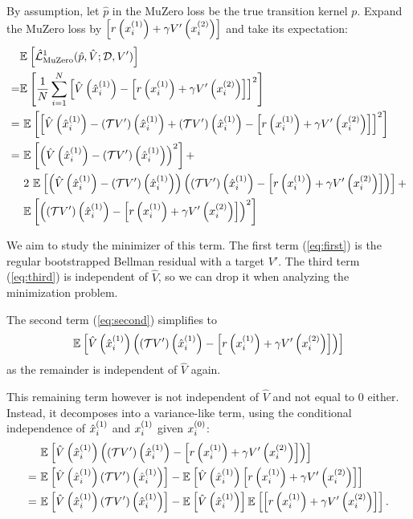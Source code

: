 By assumption, let $\hat{p}$ in the MuZero loss be the true transition kernel $p$. Expand the MuZero loss by $\TrV$ and take its expectation:
\begin{align}
    &\EEX{}{\hat{\mathcal{L}}^1_\text{MuZero}(\hat{p}, \hat{V}; \mathcal{D}, V')}\nonumber\\ 
  =& \EEX{}{\frac{1}{N}\sum_{i=1}^N \squareb{ \hat{V}\roundb{\mx{1}} - \TrV }^2}\nonumber\\
  = &~\EEX{}{\squareb{ \hat{V}\roundb{\mx{1}} - \target + \target - \TrV  }^2}\nonumber\\
  = &~\EEX{}{ \roundb{\hat{V}\roundb{\mx{1}} - \target}^2}  +\label{eq:first}\\
    &~2~\EEX{}{\roundb{\hat{V}\roundb{\mx{1}} - \target}\roundb{\target - \TrV}} + \label{eq:second}\\
    &~\EEX{}{\roundb{\target - \TrV}^2}\label{eq:third}
\end{align}

We aim to study the minimizer of this term.
The first term (\autoref{eq:first}) is the regular bootstrapped Bellman residual with a target $V'$.
The third term (\autoref{eq:third}) is independent of $\hat{V}$, so we can drop it when analyzing the minimization problem.

The second term (\autoref{eq:second}) simplifies to
\begin{align*}
    \EEX{}{\hat{V}\roundb{\mx{1}}\roundb{\target - \TrV}}
\end{align*}
as the remainder is independent of $\hat{V}$ again.

This remaining term however is not independent of $\hat{V}$ and not equal to $0$ either.
Instead, it decomposes into a variance-like term, using the conditional independence of $\mx{1}$ and $\px{1}$ given $\px{0}$:
\begin{align*}
    &~\EEX{}{ \hat{V}\roundb{\mx{1}}\roundb{\target - \TrV}}\\
    =&~\EEX{}{ \hat{V}\roundb{\mx{1}}\target} - \EEX{}{\hat{V}\roundb{\mx{1}}\TrV}\\
    =&~\EEX{}{ \hat{V}\roundb{\mx{1}}\target} - \EEX{}{\hat{V}\roundb{\mx{1}}} \EEX{}{\TrV}.
\end{align*}


